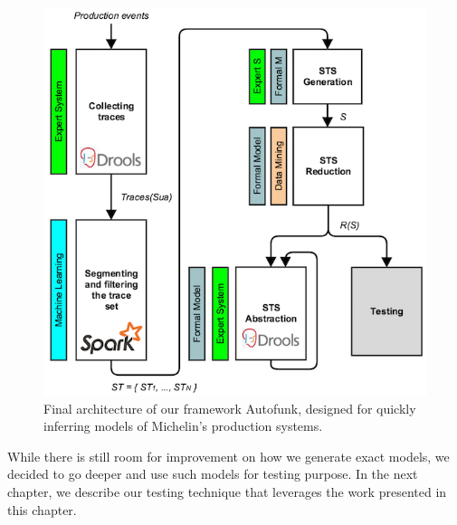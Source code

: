 \begin{figure}[h]
    \includegraphics[width=1.0\linewidth]{figures/autofunk_branded.png}

    \caption{Final architecture of our framework Autofunk,
    designed for quickly inferring models of Michelin's
    production systems.}
    \label{fig:autofunk_branded}
\end{figure}

While there is still room for improvement on how we generate
exact models, we decided to go deeper and use such models for
testing purpose. In the next chapter, we describe our testing
technique that leverages the work presented in this chapter.
